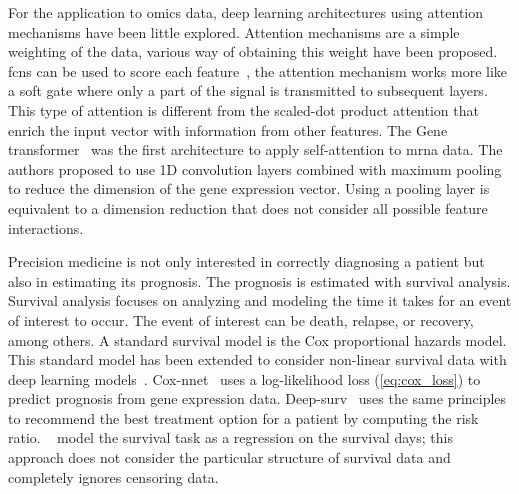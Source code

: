 \documentclass[../main.tex]{subfiles}
\begin{document}
	For the application to omics data, deep learning architectures using attention mechanisms have been little explored.
	Attention mechanisms are a simple weighting of the data, various way of obtaining this weight have been proposed.
	\Glspl{fcn} can be used to score each feature~\cite{Lee2022,beykikhoshkDeepTRIAGEInterpretableIndividualised2020a}, the attention mechanism works more like a soft gate where only a part of the signal is transmitted to subsequent layers.
	This type of attention is different from the scaled-dot product attention that enrich the input vector with information from other features.
	The Gene transformer~\cite{Khan2023} was the first architecture to apply self-attention to \gls{mrna} data.
	The authors proposed to use 1D convolution layers combined with maximum pooling to reduce the dimension of the gene expression vector.
	Using a pooling layer is equivalent to a dimension reduction that does not consider all possible feature interactions.

	Precision medicine is not only interested in correctly diagnosing a patient but also in estimating its prognosis.
	The prognosis is estimated with survival analysis.
	Survival analysis focuses on analyzing and modeling the time it takes for an event of interest to occur.
	The event of interest can be death, relapse, or recovery, among others.
	A standard survival model is the Cox proportional hazards model.
	This standard model has been extended to consider non-linear survival data with deep learning models~\cite{katzmanDeepSurvPersonalizedTreatment2018,Ching2018}.
	Cox-nnet~\cite{Ching2018} uses a log-likelihood loss (\cref{eq:cox_loss}) to predict prognosis from gene expression data.
	Deep-surv~\cite{katzmanDeepSurvPersonalizedTreatment2018} uses the same principles to recommend the best treatment option for a patient by computing the risk ratio.
	\citeauthor{Lee2022}~\cite{Lee2022} model the survival task as a regression on the survival days; this approach does not consider the particular structure of survival data and completely ignores censoring data.
\end{document}
